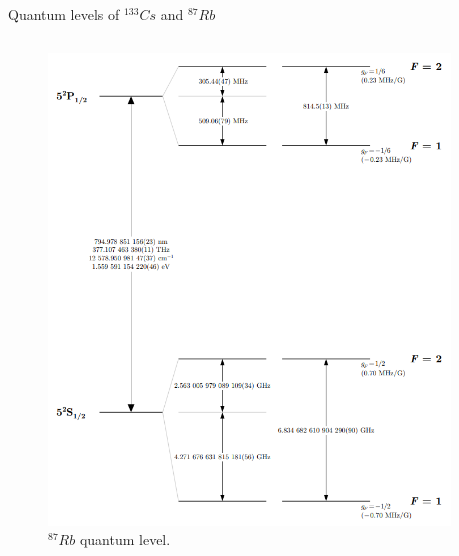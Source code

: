 \begin{frame}{Quantum levels of $^{133}Cs$ and $^{87}Rb$}

    \begin{columns}[c, onlytextwidth]

        \begin{column}{0.5\textwidth}

            \begin{figure}
                \centering
                \includegraphics[height=0.7\textheight]{img/levels-Rubidium.png}
                \caption{$^{87}Rb$ quantum level.}
            \end{figure}

        \end{column}

        \begin{column}{0.5\textwidth}


\end{column}
\end{columns}
\end{frame}

